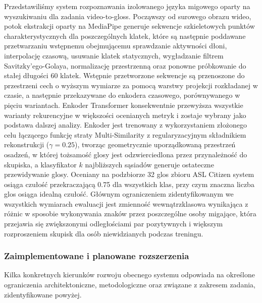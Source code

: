 Przedstawiliśmy system rozpoznawania izolowanego języka migowego oparty na
wyszukiwaniu dla zadania video-to-gloss. Począwszy od surowego obrazu wideo,
potok ekstrakcji oparty na MediaPipe generuje sekwencje szkieletowych punktów
charakterystycznych dla poszczególnych klatek, które są następnie poddawane
przetwarzaniu wstępnemu obejmującemu sprawdzanie aktywności dłoni,
interpolację czasową, usuwanie klatek statycznych, wygładzanie filtrem
Savitzky'ego-Golaya, normalizację przestrzenną oraz ponowne próbkowanie do
stałej długości 60 klatek. Wstępnie przetworzone sekwencje są przenoszone
do przestrzeni cech o wyższym wymiarze za pomocą warstwy projekcji
rozkładanej w czasie, a następnie przekazywane do enkodera czasowego,
porównywanego w pięciu wariantach. Enkoder Transformer konsekwentnie
przewyższa wszystkie warianty rekurencyjne w większości ocenianych metryk
i zostaje wybrany jako podstawa dalszej analizy. Enkoder jest trenowany
z wykorzystaniem złożonego celu łączącego funkcję straty Multi-Similarity
z regularyzacyjnym składnikiem rekonstrukcji ($\gamma=0.25$), tworząc
geometrycznie uporządkowaną przestrzeń osadzeń, w której tożsamość glosy
jest odzwierciedlona przez przynależność do skupiska, a klasyfikator
$k$ najbliższych sąsiadów generuje ostateczne przewidywanie glosy.
Oceniany na podzbiorze 32 glos zbioru ASL Citizen system osiąga czułość
przekraczającą 0.75 dla wszystkich klas, przy czym znaczna liczba glos
osiąga idealną czułość. Głównym ograniczeniem zidentyfikowanym we wszystkich
wymiarach ewaluacji jest zmienność wewnątrzklasowa wynikająca z różnic
w sposobie wykonywania znaków przez poszczególne osoby migające, która
przejawia się zwiększonymi odległościami par pozytywnych i większym
rozproszeniem skupisk dla osób niewidzianych podczas treningu.

\subsubsection{Zaimplementowane i planowane rozszerzenia}

Kilka konkretnych kierunków rozwoju obecnego systemu odpowiada na określone
ograniczenia architektoniczne, metodologiczne oraz związane z zakresem zadania,
zidentyfikowane powyżej.

